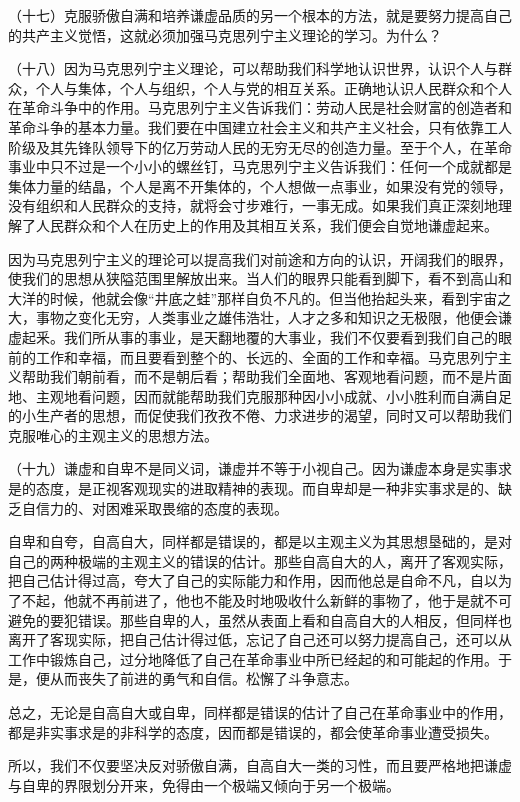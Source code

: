 （十七）克服骄傲自满和培养谦虚品质的另一个根本的方法，就是要努力提高自己的共产主义觉悟，这就必须加强马克思列宁主义理论的学习。为什么？

（十八）因为马克思列宁主义理论，可以帮助我们科学地认识世界，认识个人与群众，个人与集体，个人与组织，个人与党的相互关系。正确地认识人民群众和个人在革命斗争中的作用。马克思列宁主义告诉我们：劳动人民是社会财富的创造者和革命斗争的基本力量。我们要在中国建立社会主义和共产主义社会，只有依靠工人阶级及其先锋队领导下的亿万劳动人民的无穷无尽的创造力量。至于个人，在革命事业中只不过是一个小小的螺丝钉，马克思列宁主义告诉我们：任何一个成就都是集体力量的结晶，个人是离不开集体的，个人想做一点事业，如果没有党的领导，没有组织和人民群众的支持，就将会寸步难行，一事无成。如果我们真正深刻地理解了人民群众和个人在历史上的作用及其相互关系，我们便会自觉地谦虚起来。

因为马克思列宁主义的理论可以提高我们对前途和方向的认识，开阔我们的眼界，使我们的思想从狭隘范围里解放出来。当人们的眼界只能看到脚下，看不到高山和大洋的时候，他就会像“井底之蛙”那样自负不凡的。但当他抬起头来，看到宇宙之大，事物之变化无穷，人类事业之雄伟浩壮，人才之多和知识之无极限，他便会谦虚起釆。我们所从事的事业，是天翻地覆的大事业，我们不仅要看到我们自己的眼前的工作和幸福，而且要看到整个的、长远的、全面的工作和幸福。马克思列宁主义帮助我们朝前看，而不是朝后看；帮助我们全面地、客观地看问题，而不是片面地、主观地看问题，因而就能帮助我们克服那种因小小成就、小小胜利而自满自足的小生产者的思想，而促使我们孜孜不倦、力求进步的渴望，同时又可以帮助我们克服唯心的主观主义的思想方法。

（十九）谦虚和自卑不是同义词，谦虚并不等于小视自己。因为谦虚本身是实事求是的态度，是正视客观现实的进取精神的表现。而自卑却是一种非实事求是的、缺乏自信力的、对困难采取畏缩的态度的表现。

自卑和自夸，自高自大，同样都是错误的，都是以主观主义为其思想垦础的，是对自己的两种极端的主观主义的错误的估计。那些自高自大的人，离开了客观实际，把自己估计得过高，夸大了自己的实际能力和作用，因而他总是自命不凡，自以为了不起，他就不再前进了，他也不能及时地吸收什么新鲜的事物了，他于是就不可避免的要犯错误。那些自卑的人，虽然从表面上看和自高自大的人相反，但同样也离开了客现实际，把自己估计得过低，忘记了自己还可以努力提高自己，还可以从工作中锻炼自己，过分地降低了自己在革命事业中所已经起的和可能起的作用。于是，便从而丧失了前进的勇气和自信。松懈了斗争意志。

总之，无论是自高自大或自卑，同样都是错误的估计了自己在革命事业中的作用，都是非实事求是的非科学的态度，因而都是错误的，都会使革命事业遭受损失。

所以，我们不仅要坚决反对骄傲自满，自高自大一类的习性，而且要严格地把谦虚与自卑的界限划分开来，免得由一个极端又倾向于另一个极端。
